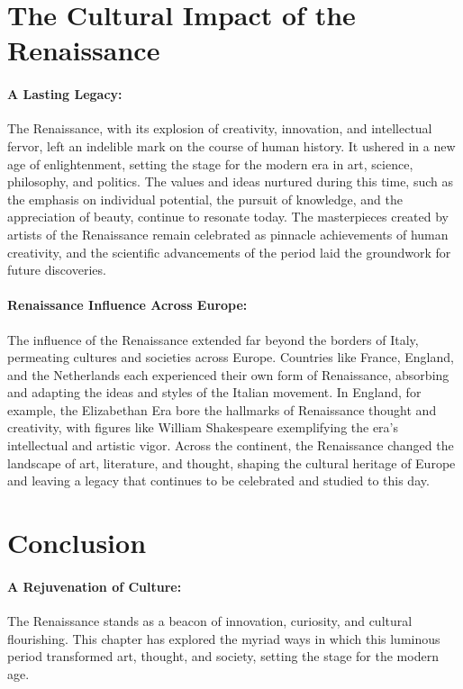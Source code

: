 \documentclass[a4paper,12pt]{book}
\begin{document}
\section*{The Cultural Impact of the Renaissance}

\paragraph{A Lasting Legacy:}
The Renaissance, with its explosion of creativity, innovation, and intellectual fervor, left an indelible mark on the course of human history. It ushered in a new age of enlightenment, setting the stage for the modern era in art, science, philosophy, and politics. The values and ideas nurtured during this time, such as the emphasis on individual potential, the pursuit of knowledge, and the appreciation of beauty, continue to resonate today. The masterpieces created by artists of the Renaissance remain celebrated as pinnacle achievements of human creativity, and the scientific advancements of the period laid the groundwork for future discoveries.

\paragraph{Renaissance Influence Across Europe:}
The influence of the Renaissance extended far beyond the borders of Italy, permeating cultures and societies across Europe. Countries like France, England, and the Netherlands each experienced their own form of Renaissance, absorbing and adapting the ideas and styles of the Italian movement. In England, for example, the Elizabethan Era bore the hallmarks of Renaissance thought and creativity, with figures like William Shakespeare exemplifying the era’s intellectual and artistic vigor. Across the continent, the Renaissance changed the landscape of art, literature, and thought, shaping the cultural heritage of Europe and leaving a legacy that continues to be celebrated and studied to this day.

\section*{Conclusion}

\paragraph{A Rejuvenation of Culture:}
The Renaissance stands as a beacon of innovation, curiosity, and cultural flourishing. This chapter has explored the myriad ways in which this luminous period transformed art, thought, and society, setting the stage for the modern age.
\end{document}
